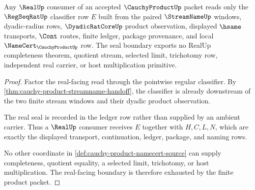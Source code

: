 \begin{theorem}
\label{thm:cauchy-product-real-seal-boundary}
Any $\RealUp$ consumer of an accepted $\CauchyProductUp$ packet reads only the $\RegSeqRatUp$ classifier row $E$ built from the paired $\StreamNameUp$ windows, dyadic-radius rows, $\DyadicRatCoreUp$ product observation, displayed $\hsame$ transports, $\Cont$ routes, finite ledger, package provenance, and local $\NameCert_{\CauchyProductUp}$ row. The seal boundary exports no RealUp completeness theorem, quotient stream, selected limit, trichotomy row, independent real carrier, or host multiplication primitive.
\end{theorem}
\begin{proof}
Factor the real-facing read through the pointwise regular classifier. By \autoref{thm:cauchy-product-streamname-handoff}, the classifier is already downstream of the two finite stream windows and their dyadic product observation.

The real seal is recorded in the ledger row rather than supplied by an ambient carrier. Thus a $\RealUp$ consumer receives $E$ together with $H,C,L,N$, which are exactly the displayed transport, continuation, ledger, package, and naming rows.

No other coordinate in \autoref{def:cauchy-product-namecert-source} can supply completeness, quotient equality, a selected limit, trichotomy, or host multiplication. The real-facing boundary is therefore exhausted by the finite product packet.
\end{proof}


